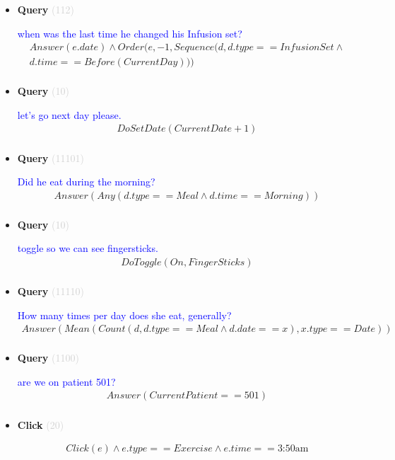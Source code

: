 \documentclass[11pt]{article}
\newcommand{\key}[1]{\textcolor{lightgray}{#1}}
\newcounter{CQuery}
\newcounter{CClick}
\begin{document}
\begin{itemize}
\item
\textbf{Query\theCQuery} \key{(112)} \addtocounter{CQuery}{1}
\textcolor{blue}{ when was the last time he changed his Infusion set? }
\begin{multline*}
Answer(e.date) \wedge Order(e, -1, Sequence(d, d.type==InfusionSet\wedge \\ 
d.time==Before(CurrentDay))) \\ 
\end{multline*}


\item
\textbf{Query\theCQuery} \key{(10)} \addtocounter{CQuery}{1}
\textcolor{blue}{ let's go next day please. }
\begin{multline*}
DoSetDate(CurrentDate + 1) \\ 
\end{multline*}


\item
\textbf{Query\theCQuery} \key{(11101)} \addtocounter{CQuery}{1}
\textcolor{blue}{ Did he eat during the morning? }
\begin{multline*}
Answer(Any(d.type==Meal \wedge d.time==Morning)) \\ 
\end{multline*}


\item
\textbf{Query\theCQuery} \key{(10)} \addtocounter{CQuery}{1}
\textcolor{blue}{ toggle so we can see fingersticks. }
\begin{multline*}
DoToggle(On, FingerSticks) \\ 
\end{multline*}


\item
\textbf{Query\theCQuery} \key{(11110)} \addtocounter{CQuery}{1}
\textcolor{blue}{ How many times per day does she eat, generally? }
\begin{multline*}
Answer(Mean(Count(d, d.type==Meal \wedge d.date==x), x.type==Date)) \\ 
\end{multline*}


\item
\textbf{Query\theCQuery} \key{(1100)} \addtocounter{CQuery}{1}
\textcolor{blue}{ are we on patient 501? }
\begin{multline*}
Answer(CurrentPatient==501) \\ 
\end{multline*}


\item
\textbf{Click\theCClick} \key{(20)} \addtocounter{CClick}{1}
\textcolor{blue}{  }
\begin{multline*}
Click(e) \wedge e.type==Exercise \wedge e.time==\mbox{3:50am} \\ 
\end{multline*}



\end{itemize}
\end{document}
